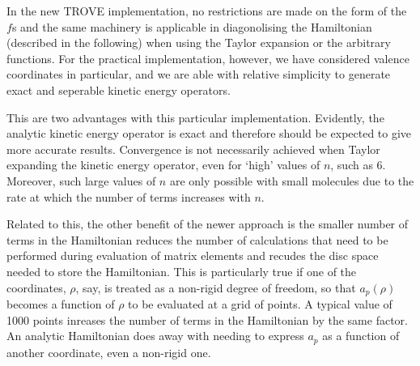 \documentclass{article}
\begin{document}
In the new TROVE implementation, no restrictions are made on the form of the $f$s and the same machinery is applicable in diagonolising the Hamiltonian (described in the following) when using the Taylor expansion or the arbitrary functions. For the practical implementation, however, we have considered valence coordinates in particular, and we are able with relative simplicity to generate exact and seperable kinetic energy operators. 

This are two advantages with this particular implementation. Evidently, the analytic kinetic energy operator is exact and therefore should be expected to give more accurate results. Convergence is not necessarily achieved when Taylor expanding the kinetic energy operator, even for `high' values of $n$, such as 6. Moreover, such large values of $n$ are only possible with small molecules due to the rate at which the number of terms increases with $n$. 

Related to this, the other benefit of the newer approach is the smaller number of terms in the Hamiltonian reduces the number of calculations that need to be performed during evaluation of matrix elements and recudes the disc space needed to store the Hamiltonian. This is particularly true if one of the coordinates, $\rho$, say, is treated as a non-rigid degree of freedom, so that $a_p(\rho)$ becomes a function of $\rho$ to be evaluated at a grid of points. A typical value of 1000 points inreases the number of terms in the Hamiltonian by the same factor. An analytic Hamiltonian does away with needing to express $a_p$ as a function of another coordinate, even a non-rigid one. 
\end{document}
